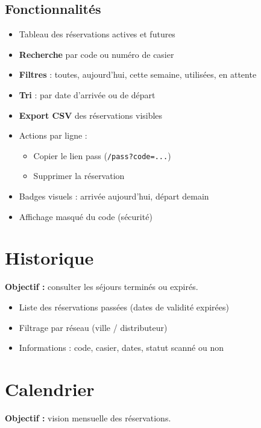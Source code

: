 \documentclass[11pt,a4paper]{article}
\begin{document}
\subsection{Fonctionnalités}
\begin{itemize}
  \item Tableau des réservations actives et futures
  \item \textbf{Recherche} par code ou numéro de casier
  \item \textbf{Filtres} : toutes, aujourd'hui, cette semaine, utilisées, en attente
  \item \textbf{Tri} : par date d'arrivée ou de départ
  \item \textbf{Export CSV} des réservations visibles
  \item Actions par ligne :
    \begin{itemize}[noitemsep]
      \item Copier le lien pass (\texttt{/pass?code=...})
      \item Supprimer la réservation
    \end{itemize}
  \item Badges visuels : arrivée aujourd'hui, départ demain
  \item Affichage masqué du code (sécurité)
\end{itemize}

\section{Historique}

\textbf{Objectif :} consulter les séjours terminés ou expirés.

\begin{itemize}[noitemsep]
  \item Liste des réservations passées (dates de validité expirées)
  \item Filtrage par réseau (ville / distributeur)
  \item Informations : code, casier, dates, statut scanné ou non
\end{itemize}

\section{Calendrier}

\textbf{Objectif :} vision mensuelle des réservations.
\end{document}

